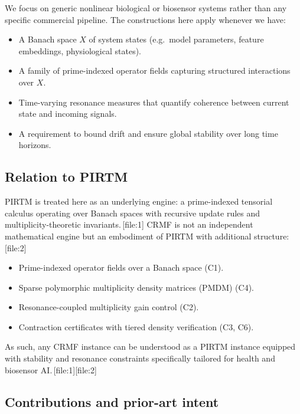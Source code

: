 \documentclass[11pt]{article}
\begin{document}
We focus on generic nonlinear biological or biosensor systems rather than any specific commercial pipeline.
The constructions here apply whenever we have:
\begin{itemize}[leftmargin=1.5em]
  \item A Banach space $X$ of system states (e.g.\ model parameters, feature embeddings, physiological states).
  \item A family of prime-indexed operator fields capturing structured interactions over $X$.
  \item Time-varying resonance measures that quantify coherence between current state and incoming signals.
  \item A requirement to bound drift and ensure global stability over long time horizons.
\end{itemize}

\subsection{Relation to PIRTM}

PIRTM is treated here as an underlying engine: a prime-indexed tensorial calculus operating over Banach spaces with recursive update rules and multiplicity-theoretic invariants.\,[file:1]
CRMF is not an independent mathematical engine but an embodiment of PIRTM with additional structure:\,[file:2]
\begin{itemize}[leftmargin=1.5em]
  \item Prime-indexed operator fields over a Banach space (C1).
  \item Sparse polymorphic multiplicity density matrices (PMDM) (C4).
  \item Resonance-coupled multiplicity gain control (C2).
  \item Contraction certificates with tiered density verification (C3, C6).
\end{itemize}
As such, any CRMF instance can be understood as a PIRTM instance equipped with stability and resonance constraints specifically tailored for health and biosensor AI.\,[file:1][file:2]

\subsection{Contributions and prior-art intent}
\end{document}
